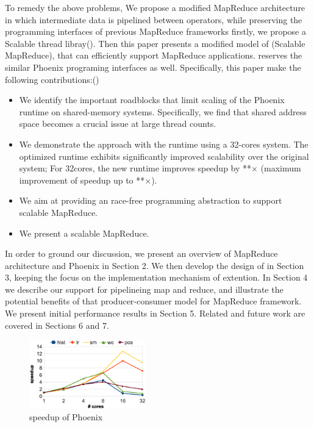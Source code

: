 To remedy the above problems, 
We propose a modified MapReduce architecture in
which intermediate data is pipelined between operators,
while preserving the programming interfaces of previous MapReduce frameworks
firstly, we propose a Scalable thread libray(\myth).
Then this paper presents a modified model of \myds(Scalable MapReduce), 
that can efficiently support MapReduce applications.
\myds reserves the similar Phoenix programing interfaces as well.
Specifically, this paper make the following contributions:()
\begin{itemize}
  \item We identify the important roadblocks 
  that limit scaling of the Phoenix runtime on shared-memory systems. 
  Specifically, we find that shared address space
   becomes a crucial issue at large thread counts.

  \item We demonstrate the approach with the \myds runtime using a 32-cores system. The optimized runtime exhibits significantly improved scalability over the
original system; For 32cores, the new runtime improves speedup by **× 
(maximum improvement of speedup up to **×).

  \item We aim at providing an race-free programming abstraction to
support scalable MapReduce.
  \item We present a scalable MapReduce.
\end{itemize}

In order to ground our discussion, we present an overview
of MapReduce architecture and Phoenix in Section 2. 
We then develop the design of \myth in Section 3, 
keeping the focus on the implementation mechanism of extention. 
In Section 4 we describe our support for pipelineing map and reduce,
and illustrate the potential benefits of that producer-consumer model for MapReduce framework. 
We present initial performance results in Section 5. 
Related and future work are covered in Sections 6 and 7.

\begin{figure}[!h!t]  
	\centering
	\includegraphics[width=0.45\textwidth]{eps/phoenix_speedup.eps}
	\caption{speedup of Phoenix}
	\label{fig:phoenix:speedup}
\end{figure}

